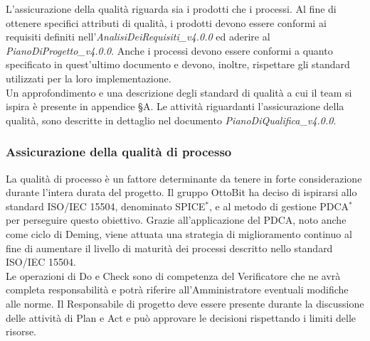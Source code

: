 \documentclass[11pt,a4paper]{article}
\begin{document}
{	L'assicurazione della qualità riguarda sia i prodotti che i processi. Al fine di ottenere specifici attributi di qualità, i prodotti devono essere conformi ai requisiti definiti nell'\textit{AnalisiDeiRequisiti\_v4.0.0} ed aderire al \textit{PianoDiProgetto\_v4.0.0}. Anche i processi devono essere conformi a quanto specificato in quest'ultimo documento e devono, inoltre, rispettare gli standard utilizzati per la loro implementazione. \\
	Un approfondimento e una descrizione degli standard di qualità a cui il team si ispira è presente in appendice \S A.
	Le attività riguardanti l'assicurazione della qualità, sono descritte in dettaglio nel documento \textit{PianoDiQualifica\_v4.0.0}.

	\subsubsection{Assicurazione della qualità di processo} 
	La qualità di processo è un fattore determinante da tenere in forte considerazione durante l'intera durata del progetto.
	Il gruppo OttoBit ha deciso di ispirarsi allo standard ISO/IEC 15504, denominato SPICE$^*$, e al metodo di gestione PDCA$^*$ per perseguire questo obiettivo.
	Grazie all'applicazione del PDCA, noto anche come ciclo di Deming, viene attuata una strategia di miglioramento continuo al fine di aumentare il livello di maturità dei processi descritto nello standard ISO/IEC 15504.\\
	Le operazioni di Do e Check sono di competenza del Verificatore che ne avrà completa responsabilità e potrà riferire all'Amministratore eventuali modifiche alle norme.
	Il Responsabile di progetto deve essere presente durante la discussione delle attività  di Plan e Act e può approvare le decisioni rispettando i limiti delle risorse.

}
\end{document}
